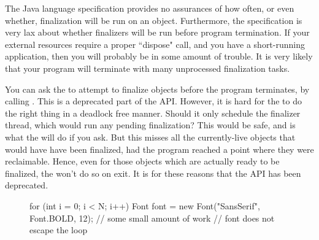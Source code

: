 The Java language specification provides no assurances of how often, or even
whether, finalization will be run on an object. Furthermore, the specification
is very lax about whether finalizers will be run before program termination. If
your external resources require a proper ``dispose" call, and you have a
short-running application, then you will probably be in some amount of trouble.
It is very likely that your program will terminate with many unprocessed
finalization tasks. 

You can ask the \jre to attempt to finalize objects before the program
terminates, by calling . This is a
deprecated part of the  API. However, it is hard for the \jre to
do the right thing in a deadlock free manner. Should it only schedule the
finalizer thread, which would run any pending finalization? This would be safe,
and is what the \jre will do if you ask. But this misses all the currently-live
objects that would have have been finalized, had the program reached a point
where they were reclaimable. Hence, even for those objects which are actually
ready to be finalized, the \jre won't do so on exit. It is for these reasons
that the API has been deprecated.




\begin{figure}
\centering
\vspace{-2mm}
\begin{framedlisting}
for (int i = 0; i < N; i++) {
   Font font = new Font("SansSerif", Font.BOLD, 12);
   // some small amount of work
} // font does not escape the loop
\end{framedlisting}
\end{figure}
